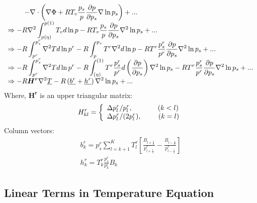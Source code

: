 \documentclass[12pt,a4paper]{book}
\begin{document}
	\begin{equation}	
	\begin{array}{l}
	\displaystyle 
	\hspace{2 pc} -\nabla \cdot \left( \nabla \Phi + RT_v \frac{p_s}{p} \frac{\partial p}{\partial p_s} \nabla \ln p_s  \right) + ... \\
	\displaystyle 
	\Rightarrow -R \nabla^2 \int_{p(\eta)}^{p(1)} T_v d\ln p - RT_v \frac{p_s}{p} \frac{\partial p}{\partial p_s} \nabla^2 \ln p_s + ... \\
	\displaystyle 
	\Rightarrow -R \int_{p^r}^{p_s^r} \nabla^2 T d\ln p^r - R \int_{p}^{p_s} T^r \nabla^2 d \ln p
	- RT^r \frac{p_s^r}{p^r} \frac{\partial p}{\partial p_s}   \nabla^2 \ln p_s + ... \\
	\displaystyle 
	\Rightarrow -R \int_{p^r}^{p_s^r} \nabla^2 T d\ln p^r - R \int_{(\eta)}^{(1)} T^r \frac{p_s^r}{p^r} d \left( \frac{\partial p}{\partial p_s} \right) \nabla^2 \ln p_s
	- RT^r \frac{p_s^r}{p^r}  \frac{\partial p}{\partial p_s}   \nabla^2 \ln p_s + ... \\
	\displaystyle 
	\Rightarrow -R \boldsymbol{H^r} \nabla^2 \underline{T} - R \left(\underline{b^r} + \underline{h^r} \right) \nabla^2 \ln p_s + ...
	\end{array}	
	\end{equation}
Where, $\boldsymbol{H^r}$ is an upper triangular matrix:
	\begin{equation} 
	H^r_{kl} = \left\lbrace
	\begin{array}{l}
	\Delta p^r_l / p^r_l,  \hspace{3 pc} (k<l) \\
	\Delta p^r_l / (2p^r_l), \hspace{2 pc} (k=l)
	\end{array} \right.
	\end{equation}
Column vectors:
	\begin{equation}
	\begin{array}{l}
	\displaystyle 
	b^r_k = p^r_s \sum_{l=k+1}^{K} T^r_l \left[ \frac{B_{l+\frac{1}{2}} }{p^r_{l+\frac{1}{2}}} - \frac{B_{l-\frac{1}{2}}}{p^r_{l-\frac{1}{2}}}  \right] \\
	\displaystyle 
	h^r_k = T^r_k \frac{p^r_s}{p^r_k} B_k	
	\end{array} 
	\end{equation}
	
\subsection{Linear Terms in Temperature Equation}
\end{document}
